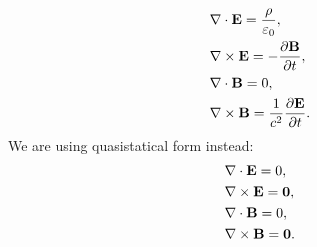 \begin{description}
\begin{subequations}
\label{full maxwell}
\begin{align}
	\label{full gauss}
	&\nabla \cdot \vb{E} = \dfrac{\rho}{\varepsilon_0}, \\
	\label{full faraday}
	&\nabla \times \vb{E} = -\dfrac{\partial\vb{B}}{\partial t}, \\
	\label{full magnet}
	&\nabla \cdot \vb{B} = 0, \\
	\label{full ampere}
	&\nabla \times \vb{B} = \dfrac{1}{c^2}\dfrac{\partial\vb{E}}{\partial t}.
\end{align}
\end{subequations}
We are using quasistatical form instead:
\begin{subequations}
\label{static maxwell}
\begin{align}
	\label{static gauss}
	&\nabla \cdot \vb{E} = 0, \\
	\label{static faraday}
	&\nabla \times \vb{E} = \vb{0}, \\
	\label{static magnet}
	&\nabla \cdot \vb{B} = 0, \\
	\label{static ampere}
	&\nabla \times \vb{B} = \vb{0}.
\end{align}
\end{subequations}
  

\end{description}
